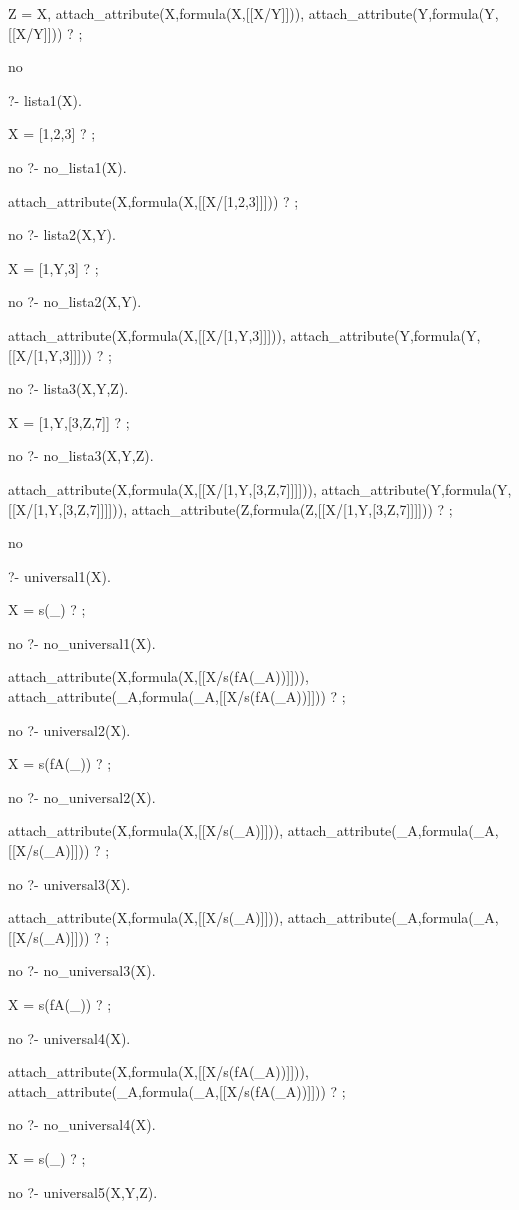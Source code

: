 Z = X,
attach_attribute(X,formula(X,[[X/Y]])),
attach_attribute(Y,formula(Y,[[X/Y]])) ? ;

no

?- lista1(X).

X = [1,2,3] ? ;

no
?- no_lista1(X).

attach_attribute(X,formula(X,[[X/[1,2,3]]])) ? ;

no
?- lista2(X,Y).

X = [1,Y,3] ? ;

no
?- no_lista2(X,Y).

attach_attribute(X,formula(X,[[X/[1,Y,3]]])),
attach_attribute(Y,formula(Y,[[X/[1,Y,3]]])) ? ;

no
?- lista3(X,Y,Z).

X = [1,Y,[3,Z,7]] ? ;

no
?- no_lista3(X,Y,Z).

attach_attribute(X,formula(X,[[X/[1,Y,[3,Z,7]]]])),
attach_attribute(Y,formula(Y,[[X/[1,Y,[3,Z,7]]]])),
attach_attribute(Z,formula(Z,[[X/[1,Y,[3,Z,7]]]])) ? ;

no

?- universal1(X).

X = s(_) ? ;

no
?- no_universal1(X).

attach_attribute(X,formula(X,[[X/s(fA(_A))]])),
attach_attribute(_A,formula(_A,[[X/s(fA(_A))]])) ? ;

no
?- universal2(X).

X = s(fA(_)) ? ;

no
?- no_universal2(X).

attach_attribute(X,formula(X,[[X/s(_A)]])),
attach_attribute(_A,formula(_A,[[X/s(_A)]])) ? ;

no
?- universal3(X).

attach_attribute(X,formula(X,[[X/s(_A)]])),
attach_attribute(_A,formula(_A,[[X/s(_A)]])) ? ;

no
?- no_universal3(X).

X = s(fA(_)) ? ;

no
?- universal4(X).

attach_attribute(X,formula(X,[[X/s(fA(_A))]])),
attach_attribute(_A,formula(_A,[[X/s(fA(_A))]])) ? ;

no
?- no_universal4(X).

X = s(_) ? ;

no
?- universal5(X,Y,Z).


